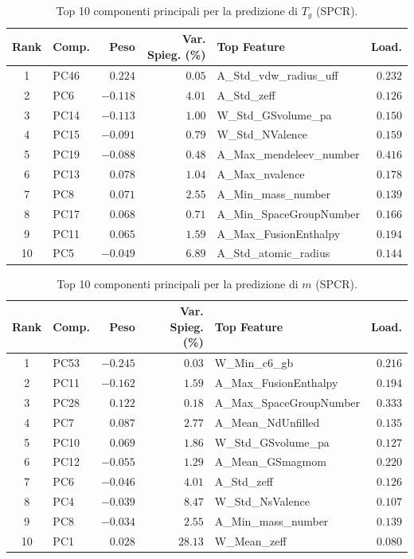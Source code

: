 \documentclass[../main.tex]{subfiles}
\begin{document}
	\begin{table}[htbp]
		\centering
		\begin{tabular}{cl r r l r}
			\toprule
			\textbf{Rank} & \textbf{Comp.} & \textbf{Peso} & \textbf{Var. Spieg. (\%)} & \textbf{Top Feature} & \textbf{Load.} \\
			\midrule
			1 & PC46 & $0.224$ & $0.05$ & A\_Std\_vdw\_radius\_uff & $0.232$ \\
			2 & PC6 & $-0.118$ & $4.01$ & A\_Std\_zeff & $0.126$ \\
			3 & PC14 & $-0.113$ & $1.00$ & W\_Std\_GSvolume\_pa & $0.150$ \\
			4 & PC15 & $-0.091$ & $0.79$ & W\_Std\_NValence & $0.159$ \\
			5 & PC19 & $-0.088$ & $0.48$ & A\_Max\_mendeleev\_number & $0.416$ \\
			6 & PC13 & $0.078$ & $1.04$ & A\_Max\_nvalence & $0.178$ \\
			7 & PC8 & $0.071$ & $2.55$ & A\_Min\_mass\_number & $0.139$ \\
			8 & PC17 & $0.068$ & $0.71$ & A\_Min\_SpaceGroupNumber & $0.166$ \\
			9 & PC11 & $0.065$ & $1.59$ & A\_Max\_FusionEnthalpy & $0.194$ \\
			10 & PC5 & $-0.049$ & $6.89$ & A\_Std\_atomic\_radius & $0.144$ \\
			\bottomrule
		\end{tabular}
		\caption{Top 10 componenti principali per la predizione di $T_g$ (SPCR).}
	\end{table}
	
	\begin{table}[htbp]
		\centering
		\begin{tabular}{cl r r l r}
			\toprule
			\textbf{Rank} & \textbf{Comp.} & \textbf{Peso} & \textbf{Var. Spieg. (\%)} & \textbf{Top Feature} & \textbf{Load.} \\
			\midrule
			1 & PC53 & $-0.245$ & $0.03$ & W\_Min\_c6\_gb & $0.216$ \\
			2 & PC11 & $-0.162$ & $1.59$ & A\_Max\_FusionEnthalpy & $0.194$ \\
			3 & PC28 & $0.122$ & $0.18$ & A\_Max\_SpaceGroupNumber & $0.333$ \\
			4 & PC7 & $0.087$ & $2.77$ & A\_Mean\_NdUnfilled & $0.135$ \\
			5 & PC10 & $0.069$ & $1.86$ & W\_Std\_GSvolume\_pa & $0.127$ \\
			6 & PC12 & $-0.055$ & $1.29$ & A\_Mean\_GSmagmom & $0.220$ \\
			7 & PC6 & $-0.046$ & $4.01$ & A\_Std\_zeff & $0.126$ \\
			8 & PC4 & $-0.039$ & $8.47$ & W\_Std\_NsValence & $0.107$ \\
			9 & PC8 & $-0.034$ & $2.55$ & A\_Min\_mass\_number & $0.139$ \\
			10 & PC1 & $0.028$ & $28.13$ & W\_Mean\_zeff & $0.080$ \\
			\bottomrule
		\end{tabular}
		\caption{Top 10 componenti principali per la predizione di $m$ (SPCR).}
	\end{table}
	
\end{document}
